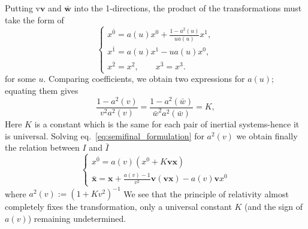 Putting v$ \mathbf{v} $ and $ \mathbf{\bar{w}} $ into the 1-directions, the product of the transformations must take the form of 
\begin{equation}
\begin{cases}
x^{\bar{0}}= a(u)x^0+\frac{1-a^2(u)}{ua(u)}x^1,\\
x^{\bar{1}}=a(u)x^1-ua(u)x^0,\\
x^{\bar{2}}=x^2, \qquad x^{\bar{3}}=x^3.  
\end{cases}
\end{equation}
for some $ u $. Comparing coefficients, we obtain two expressions for $ a( u) $; equating them gives
\begin{equation}
\label{eq:semifinal_formulation}
\frac{1-a^2(v)}{v^2a^2(v)}=\frac{1-a^2(\bar{w})}{\bar{w}^2a^2(\bar{w})}=K,
\end{equation}
Here $ K $ is a constant which is the same for each pair of inertial systems-hence it is universal. Solving eq.~\eqref{eq:semifinal_formulation} for $ a^2(v) $ we obtain finally the relation between $ I $ and $ \bar{I} $
\begin{equation}
\begin{cases}
x^{\bar{0}}=a(v)(x^0+K\mathbf{v}\mathbf{x})\\
\bar{\mathbf{x}}=\mathbf{x}+\frac{a(v)-1}{v^2}\mathbf{v}(\mathbf{v}\mathbf{x})-a(v)\mathbf{v}x^0
\end{cases}
\end{equation}
where $ a^2(v):=(1+Kv^2)^{-1} $
We see that the principle of relativity almost completely fixes the transformation, only a universal constant $ K $ (and the sign of $ a(v) $) remaining undetermined.